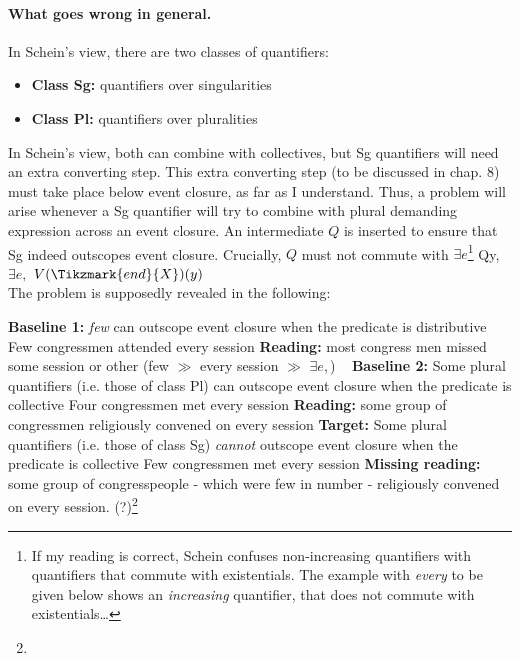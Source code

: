 \documentclass[english]{article}
\begin{document}
\paragraph{What goes wrong in general.} In Schein's view, there are two classes of quantifiers:

\begin{itemize}
\item \textbf{Class Sg:} quantifiers over singularities 
\item \textbf{Class Pl:} quantifiers over pluralities
\end{itemize}
%
In Schein's view, both can combine with collectives, but Sg quantifiers will need an extra converting step. This extra converting step (to be discussed in chap. 8) must take place below event closure, as far as I understand. Thus, a problem will arise whenever a Sg quantifier will try to combine with plural demanding expression across an event closure. An intermediate $Q$ is inserted to ensure that Sg indeed outscopes event closure. Crucially, $Q$ must not commute with $\exists e$\footnote{If my reading is correct, Schein confuses non-increasing quantifiers with quantifiers that commute with existentials. The example with \emph{every} to be given below shows an \emph{increasing} quantifier, that does not commute with existentials\ldots}
\ex
{}\hspace{1.5ex} Qy,\hspace{1.5ex} $\exists e,$\hspace{1.5ex} $V(\Tikzmark{end}{X})(y)$\\
\xe
%
The problem is supposedly revealed in the following:

\pex \textbf{Baseline 1:} \emph{few} can outscope event closure when the predicate is distributive
\a Few congressmen attended every session
\a \textbf{Reading:} most congress men missed some session or other (few $\gg$ every session $\gg$ $\exists e,$)
\xe
%
\pex~ \textbf{Baseline 2:} Some plural quantifiers (i.e. those of class Pl) can outscope event closure when the predicate is collective
\a Four congressmen met every session
\a \textbf{Reading:} some group of congressmen religiously convened on every session
\xe
%
\pex \textbf{Target:} Some plural quantifiers (i.e. those of class Sg) \emph{cannot} outscope event closure when the predicate is collective
\a Few congressmen met every session
\a \textbf{Missing reading:} some group of congresspeople - which were few in number - religiously convened on every session. (?)\footnote{}
\xe
%
\end{document}
